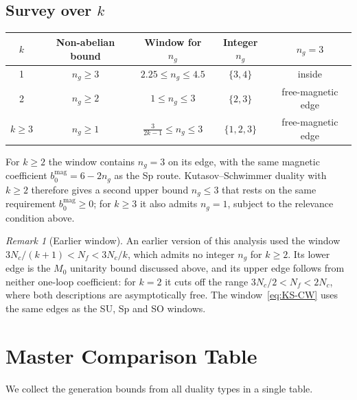 \documentclass[11pt,a4paper]{article}
\theoremstyle{plain}
\theoremstyle{definition}
\theoremstyle{remark}
\newtheorem{remark}[theorem]{Remark}
\newcommand{\Nc}{N_{\!c}}
\newcommand{\Nf}{N_{\!f}}
\newcommand{\ngen}{n_g}
\begin{document}
\subsection{Survey over $k$}

\begin{center}
\renewcommand{\arraystretch}{1.5}
\begin{tabular}{c c c c c}
\toprule
$k$ & Non-abelian bound & Window for $\ngen$ &
  Integer $\ngen$ & $\ngen = 3$ \\
\midrule
1 & $\ngen \geq 3$ & $2.25 \leq \ngen \leq 4.5$ & $\{3, 4\}$ &
  inside \\
2 & $\ngen \geq 2$ & $1 \leq \ngen \leq 3$ & $\{2, 3\}$ &
  free-magnetic edge \\
$k \geq 3$ & $\ngen \geq 1$ & $\frac{3}{2k-1} \leq \ngen \leq 3$ &
  $\{1, 2, 3\}$ & free-magnetic edge \\
\bottomrule
\end{tabular}
\end{center}

For $k \geq 2$ the window contains $\ngen = 3$ on its edge, with the same
magnetic coefficient $b_0^{\mathrm{mag}} = 6 - 2\ngen$ as the Sp route.
Kutasov--Schwimmer duality with $k \geq 2$ therefore gives a second upper
bound $\ngen \leq 3$ that rests on the same requirement
$b_0^{\mathrm{mag}} \geq 0$; for $k \geq 3$ it also admits $\ngen = 1$,
subject to the relevance condition above.

\begin{remark}[Earlier window]
An earlier version of this analysis used the window
$3\Nc/(k+1) < \Nf < 3\Nc/k$, which admits no integer $\ngen$ for
$k \geq 2$.  Its lower edge is the $M_0$ unitarity bound discussed above,
and its upper edge follows from neither one-loop coefficient: for $k = 2$
it cuts off the range $3\Nc/2 < \Nf < 2\Nc$, where both descriptions are
asymptotically free.  The window~\eqref{eq:KS-CW} uses the same edges as
the SU, Sp and SO windows.
\end{remark}


\section{Master Comparison Table}
\label{sec:master-table}

We collect the generation bounds from all duality types in a single
table.
\end{document}
